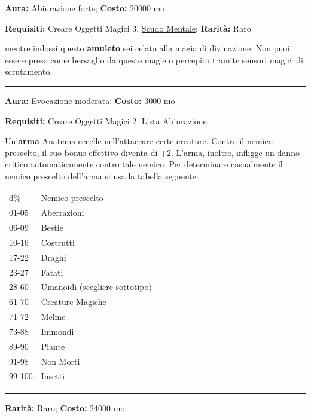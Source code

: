 \begin{multicols}{2}
\textbf{Aura:} Abiurazione forte; \textbf{Costo:} 20000 mo

\textbf{Requisiti:} Creare Oggetti Magici 3, \hyperlink{AnellodelloScudoMentale}{Scudo Mentale}; \textbf{Rarità:} Raro

mentre indossi questo \textbf{amuleto} sei celato alla magia di divinazione. Non puoi essere preso come bersaglio da queste magie o percepito tramite sensori magici di scrutamento.

\smallskip\noindent\rule{\linewidth}{2pt}  \hypertarget{Anatema}{}\medskip{}\noindent\label{Anatema}

\textbf{Aura:} Evocazione moderata; \textbf{Costo:} 3000 mo

\textbf{Requisiti:} Creare Oggetti Magici 2, Lista Abiurazione

Un'\textbf{arma} Anatema eccelle nell'attaccare certe creature. Contro il nemico prescelto, il suo bonus effettivo diventa di +2. L'arma, inoltre, infligge un danno critico automaticamente contro tale nemico. Per determinare casualmente il nemico prescelto dell'arma si usa la tabella seguente:

\medskip

\begin{tabular}{ll}
d\% &Nemico prescelto\\
01-05 &Aberrazioni\\
06-09 &Bestie\\
10-16 &Costrutti\\
17-22 &Draghi\\
23-27 &Fatati\\
28-60 &Umanoidi (scegliere sottotipo)\\
61-70 &Creature Magiche\\
71-72 &Melme\\
73-88 &Immondi\\
89-90 &Piante\\
91-98 &Non Morti\\
99-100 &Insetti
\end{tabular}

\medskip

\smallskip\noindent\rule{\linewidth}{2pt}  \hypertarget{AnelloAccumulaIncantesimi}{}\medskip{}\noindent\label{AnelloAccumulaIncantesimi}

\textbf{Rarità:} Raro; \textbf{Costo:} 24000 mo


\end{multicols}
